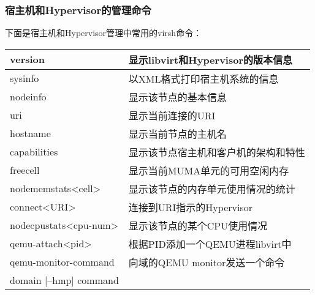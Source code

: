 \documentclass[a4paper,left=2.5cm,right=2.5cm,11pt]{article}
\begin{document}
\subsubsection{宿主机和Hypervisor的管理命令}
	下面是宿主机和Hypervisor管理中常用的virsh命令：
	\begin{longtable}{p{6cm}p{7cm}}
	\hline
	version & 显示libvirt和Hypervisor的版本信息 \\
	\hline
	sysinfo & 以XML格式打印宿主机系统的信息 \\
	\hline
	nodeinfo & 显示该节点的基本信息 \\
	\hline
	uri & 显示当前连接的URI \\
	\hline
	hostname & 显示当前节点的主机名 \\
	\hline
	capabilities & 显示该节点宿主机和客户机的架构和特性 \\
	\hline
	freecell & 显示当前MUMA单元的可用空闲内存 \\
	\hline
	nodememstats<cell> & 显示该节点的内存单元使用情况的统计 \\
	\hline
	connect<URI> & 连接到URI指示的Hypervisor \\
	\hline
	nodecpustats<cpu-num> & 显示该节点的某个CPU使用情况 \\
	\hline
	qemu-attach<pid> & 根据PID添加一个QEMU进程libvirt中 \\
	\hline
	qemu-monitor-command  & 向域的QEMU monitor发送一个命令 \\
	domain [--hmp] command & \\
	\hline
	\end{longtable}
\end{document}
